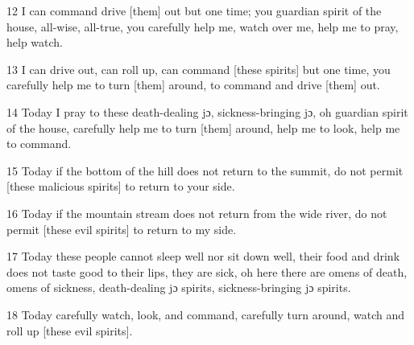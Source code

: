12 I can command drive [them] out but one time; you guardian spirit of the house,
all-wise, all-true, you carefully help me, watch over me, help me to pray, help
watch.

13 I can drive out, can roll up, can command [these spirits] but one time, you
carefully help me to turn [them] around, to command and drive [them] out.

14 Today I pray to these death-dealing jɔ, sickness-bringing jɔ, oh guardian
spirit of the house, carefully help me to turn [them] around, help me to look,
help me to command.

15 Today if the bottom of the hill does not return to the summit, do not permit
[these malicious spirits] to return to your side.

16 Today if the mountain stream does not return from the wide river, do not permit
[these evil spirits] to return to my side.

17 Today these people cannot sleep well nor sit down well, their food and drink
does not taste good to their lips, they are sick, oh here there are omens of death,
omens of sickness, death-dealing jɔ spirits, sickness-bringing jɔ spirits.

18 Today carefully watch, look, and command, carefully turn around, watch and roll
up [these evil spirits].

